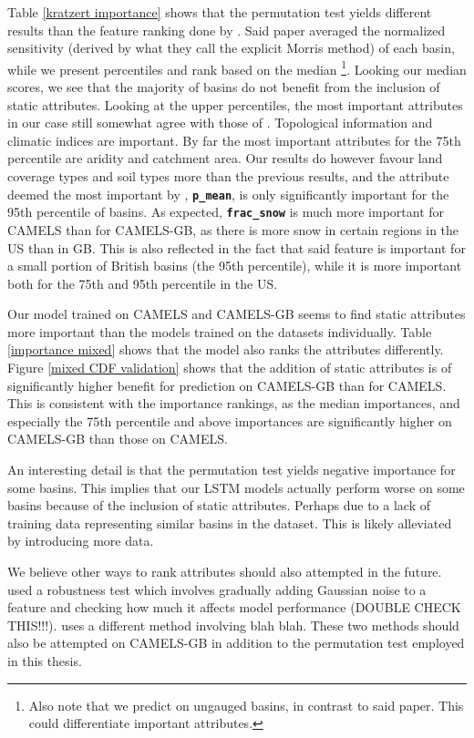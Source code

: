 Table \ref{kratzert importance} shows that the permutation test yields different 
results than the feature ranking done by \citet{lstm_second_paper}. Said paper 
averaged the normalized sensitivity (derived by what they call the explicit Morris 
method) of each basin, while we present percentiles and rank based on the median
\footnote{Also note that we predict on ungauged basins, in contrast to said paper. 
This could differentiate important attributes.}. 
Looking our median scores, we see that the majority of basins do not benefit 
from the inclusion of static attributes. Looking at the upper percentiles, the 
most important attributes in our case still somewhat agree with those of 
\citet{lstm_second_paper}. Topological information and climatic indices are important. 
By far the most important attributes for the 75th percentile are aridity and 
catchment area. Our results do however favour land coverage types and soil types 
more than the previous results, and the attribute deemed the most important by 
\citet{lstm_second_paper}, \textbf{\texttt{p\_mean}}, is only significantly important 
for the 95th percentile of basins. As expected, \textbf{\texttt{frac\_snow}} is 
much more important for CAMELS than for CAMELS-GB, as there is more snow 
in certain regions in the US than in GB. This is also reflected in the fact that 
said feature is important for a small portion of British basins (the 95th percentile), 
while it is more important both for the 75th and 95th percentile in the US. 

Our model trained on CAMELS and CAMELS-GB seems to find static attributes more important 
than the models trained on the datasets individually. Table \ref{importance mixed} 
shows that the model also ranks the attributes differently. Figure \ref{mixed CDF validation} 
shows that the addition of static attributes is of significantly higher benefit for 
prediction on CAMELS-GB than for CAMELS. This is consistent with the importance rankings, as 
the median importances, and especially the 75th percentile and above importances are 
significantly higher on CAMELS-GB than those on CAMELS. 

An interesting detail is that the permutation test yields negative importance 
for some basins. This implies that our LSTM models actually perform worse 
on some basins because of the inclusion of static attributes. Perhaps due to a 
lack of training data representing similar basins in the dataset. This is likely 
alleviated by introducing more data.

We believe other ways to rank attributes should also attempted 
in the future. \citet{lstm_second_paper} used a robustness test which 
involves gradually adding Gaussian noise to a feature and checking how much it 
affects model performance (DOUBLE CHECK THIS!!!). \citet{OrigCAMELSRanking} 
uses a different method involving blah blah. These two methods should also be 
attempted on CAMELS-GB in addition to the permutation test employed in this 
thesis.



